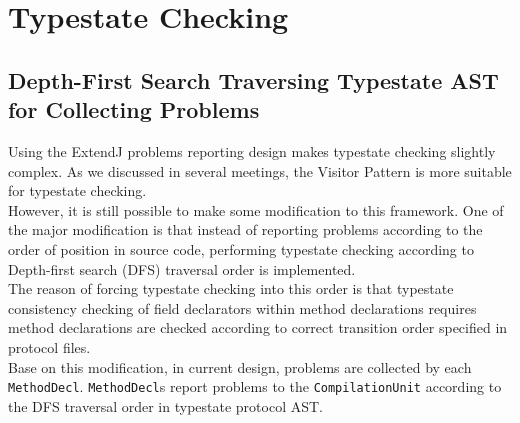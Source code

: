 \documentclass[]{article}
\begin{document}
\section{Typestate Checking}

\subsection{Depth-First Search Traversing Typestate AST for Collecting Problems}
Using the ExtendJ problems reporting design makes typestate checking slightly complex. As we discussed in several meetings, the Visitor Pattern is more suitable for typestate checking. \\[0.2cm]
However, it is still possible to make some modification to this framework. One of the major modification is that instead of reporting problems according to the order of position in source code, performing typestate checking according to Depth-first search (DFS) traversal order is implemented. \\[0.2cm]
The reason of forcing typestate checking into this order is that typestate consistency checking of field declarators within method declarations requires method declarations are checked according to correct transition order specified in protocol files. \\[0.2cm]
Base on this modification, in current design, problems are collected by each \texttt{MethodDecl}. \texttt{MethodDecl}s report problems to the \texttt{CompilationUnit} according to the DFS traversal order in typestate protocol AST. 
\end{document}
